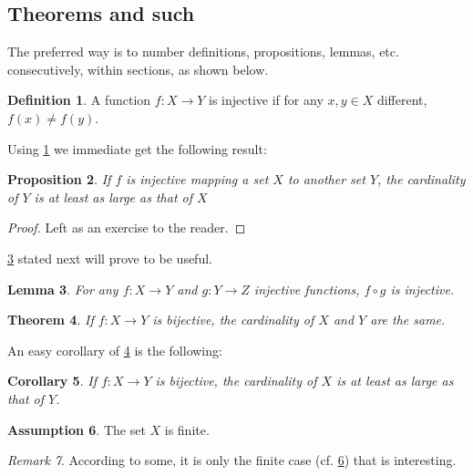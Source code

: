 \documentclass{article}
\theoremstyle{plain}
\newtheorem{theorem}{Theorem}[section]
\newtheorem{proposition}[theorem]{Proposition}
\newtheorem{lemma}[theorem]{Lemma}
\newtheorem{corollary}[theorem]{Corollary}
\theoremstyle{definition}
\newtheorem{definition}[theorem]{Definition}
\newtheorem{assumption}[theorem]{Assumption}
\theoremstyle{remark}
\newtheorem{remark}[theorem]{Remark}
\begin{document}
    \subsection{Theorems and such}
    The preferred way is to number definitions, propositions, lemmas, etc. consecutively, within sections, as shown below.
    \begin{definition}
    \label{def:inj}
    A function $f:X \to Y$ is injective if for any $x,y\in X$ different, $f(x)\ne f(y)$.
    \end{definition}
    Using \cref{def:inj} we immediate get the following result:
    \begin{proposition}
    If $f$ is injective mapping a set $X$ to another set $Y$, 
    the cardinality of $Y$ is at least as large as that of $X$
    \end{proposition}
    \begin{proof} 
    Left as an exercise to the reader. 
    \end{proof}
    \cref{lem:usefullemma} stated next will prove to be useful.
    \begin{lemma}
    \label{lem:usefullemma}
    For any $f:X \to Y$ and $g:Y\to Z$ injective functions, $f \circ g$ is injective.
    \end{lemma}
    \begin{theorem}
    \label{thm:bigtheorem}
    If $f:X\to Y$ is bijective, the cardinality of $X$ and $Y$ are the same.
    \end{theorem}
    An easy corollary of \cref{thm:bigtheorem} is the following:
    \begin{corollary}
    If $f:X\to Y$ is bijective, 
    the cardinality of $X$ is at least as large as that of $Y$.
    \end{corollary}
    \begin{assumption}
    The set $X$ is finite.
    \label{ass:xfinite}
    \end{assumption}
    \begin{remark}
    According to some, it is only the finite case (cf. \cref{ass:xfinite}) that is interesting.
    \end{remark}


\end{document}
